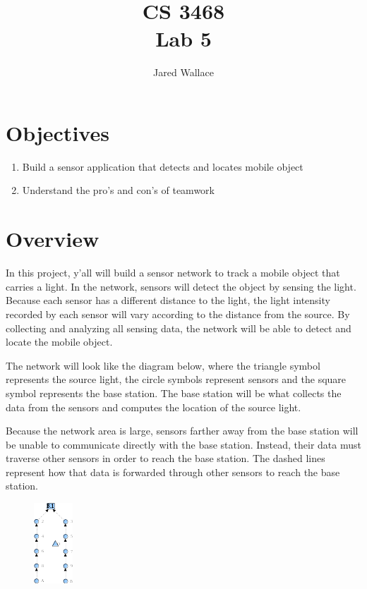 \documentclass[letterpaper,12pt]{article}
\title{\Large CS 3468\\Lab 5}
\author{Jared Wallace}
\date{}
\begin{document}
\maketitle

\vspace{30mm}

\section*{Objectives}
\begin{enumerate}
\item Build a sensor application that detects and locates mobile object
\item Understand the pro's and con's of teamwork
\end{enumerate}

\section*{Overview}
In this project, y'all will build a sensor network to track a mobile object
that carries a light. In the network, sensors will detect the object by sensing
the light. Because each sensor has a different distance to the light, the light
intensity recorded by each sensor will vary according to the distance from the source.
By collecting and analyzing all sensing data, the network will be able to detect and
locate the mobile object.

The network will look like the diagram below, where the triangle symbol represents the source
light, the circle symbols represent sensors and the square symbol represents the base station.
The base station will be what collects the data from the sensors and computes the location of
the source light.

Because the network area is large, sensors farther away from the base station will be unable to
communicate directly with the base station. Instead, their data must traverse other sensors in
order to reach the base station. The dashed lines represent how that data is forwarded through
other sensors to reach the base station.
\begin{figure}[H]
	\centering
	\includegraphics[width=.75in]{network.png}
\end{figure}
\end{document}
